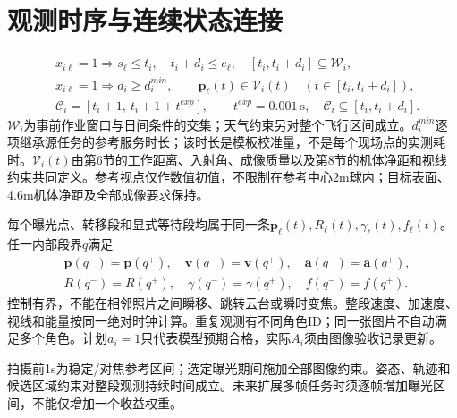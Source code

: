 \section{观测时序与连续状态连接}
\begin{align}
 &x_{i\ell}=1\Rightarrow s_\ell\le t_i,\quad t_i+d_i\le e_\ell,\quad
 [t_i,t_i+d_i]\subseteq\mathcal W_i,\label{eng:eq:window}\\
 &x_{i\ell}=1\Rightarrow d_i\ge d_i^{min},\qquad
 \mathbf p_\ell(t)\in\mathcal V_i(t)
       \quad(t\in[t_i,t_i+d_i]),\label{eng:eq:viewregion}\\
 &\mathcal C_i=[t_i+1,\ t_i+1+t^{exp}],\qquad t^{exp}=0.001\ \mathrm s,
 \quad \mathcal C_i\subseteq[t_i,t_i+d_i].\label{eng:eq:exposure}
\end{align}
\noindent $\mathcal W_i$为事前作业窗口与日间条件的交集；天气约束另对整个飞行区间成立。$d_i^{min}$逐项继承源任务的参考服务时长；该时长是模板校准量，不是每个现场点的实测耗时。$\mathcal V_i(t)$由第6节的工作距离、入射角、成像质量以及第8节的机体净距和视线约束共同定义。参考视点仅作数值初值，不限制在参考中心2m球内；目标表面、4.6m机体净距及全部成像要求保持。

\noindent 每个曝光点、转移段和显式等待段均属于同一条$\mathbf p_\ell(t),R_\ell(t),\gamma_\ell(t),f_\ell(t)$。任一内部段界$q$满足
\begin{align}
 &\mathbf p(q^-)=\mathbf p(q^+),\quad
 \mathbf v(q^-)=\mathbf v(q^+),\quad\mathbf a(q^-)=\mathbf a(q^+),\\
 &R(q^-)=R(q^+),\quad \gamma(q^-)=\gamma(q^+),\quad f(q^-)=f(q^+).
 \label{eng:eq:statejoins}
\end{align}
\noindent 控制有界，不能在相邻照片之间瞬移、跳转云台或瞬时变焦。整段速度、加速度、视线和能量按同一绝对时钟计算。重复观测有不同角色ID；同一张图片不自动满足多个角色。计划$a_i=1$只代表模型预期合格，实际$A_i$须由图像验收记录更新。

\noindent 拍摄前1s为稳定/对焦参考区间；选定曝光期间施加全部图像约束。姿态、轨迹和候选区域约束对整段观测持续时间成立。未来扩展多帧任务时须逐帧增加曝光区间，不能仅增加一个收益权重。
\clearpage

